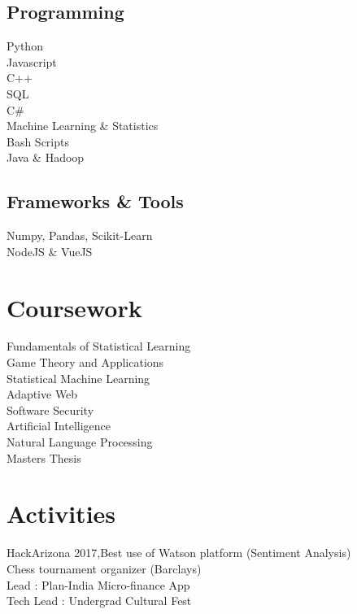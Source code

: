 \documentclass[]{deedy-resume-openfont}
\begin{document}
\begin{minipage}[t]{0.33\textwidth}
\subsection{Programming}

\textbullet{} Python \\
\textbullet{} Javascript \\
\textbullet{} C++ \\
\textbullet{} SQL \\

\textbullet{} C\# \\
\textbullet{} Machine Learning \& Statistics \\
\textbullet{} Bash Scripts \\
\textbullet{} Java \& Hadoop \\
\sectionsep

\subsection{Frameworks \& Tools}
\textbullet{} Numpy, Pandas, Scikit-Learn\\
\textbullet{} NodeJS \& VueJS \\
\sectionsep

\hspace{+0.25mm}
\section{Coursework}
Fundamentals of Statistical Learning\\
Game Theory and Applications\\
Statistical Machine Learning\\
Adaptive Web\\
Software Security\\
Artificial Intelligence \\
Natural Language Processing\\
Masters Thesis
\sectionsep

\section{Activities}
HackArizona 2017,Best use of Watson platform (Sentiment Analysis)\\
Chess tournament organizer (Barclays)\\
Lead : Plan-India Micro-finance App\\
Tech Lead : Undergrad Cultural Fest\\

%
%

\end{minipage} 
\end{document}
